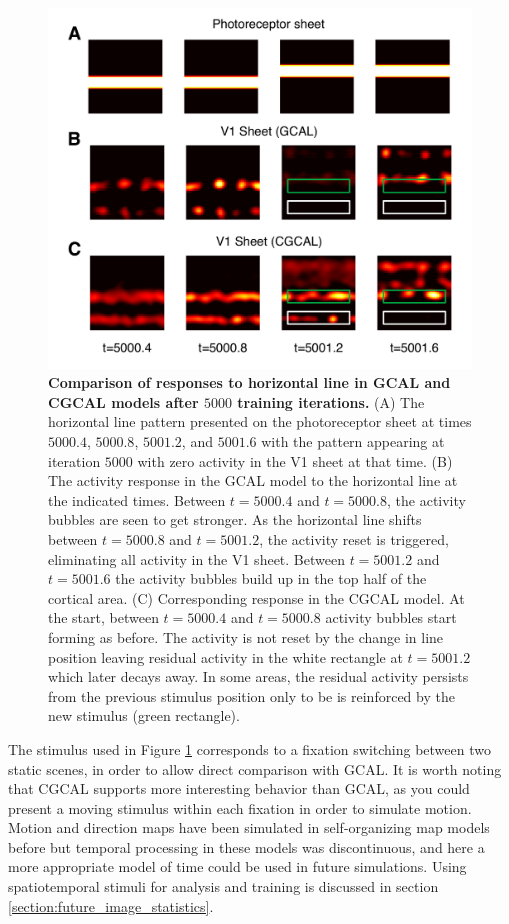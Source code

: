 \documentclass[phd,ianc,twoside]{infthesis}
\begin{document}
\begin{figure}
\centerline{ \includegraphics[scale=0.7]{./figures/V1_activity_CGCAL.pdf} }
\caption[]{{\bf Comparison of responses to horizontal line in GCAL and
    CGCAL models after $5000$ training iterations.} (A) The horizontal
  line pattern presented on the photoreceptor sheet at times $5000.4$,
  $5000.8$, $5001.2$, and $5001.6$ with the pattern appearing at iteration
  $5000$ with zero activity in the V1 sheet at that time. (B) The
  activity response in the GCAL model to the horizontal line at the
  indicated times. Between $t=5000.4$ and $t=5000.8$, the activity
  bubbles are seen to get stronger. As the horizontal line shifts
  between $t=5000.8$ and $t=5001.2$, the activity reset is triggered,
  eliminating all activity in the V1 sheet. Between $t=5001.2$ and
  $t=5001.6$ the activity bubbles build up in the top half of the
  cortical area. (C) Corresponding response in the CGCAL model. At the
  start, between $t=5000.4$ and $t=5000.8$ activity bubbles start
  forming as before. The activity is not reset by the change in line
  position leaving residual activity in the white rectangle at
  $t=5001.2$ which later decays away. In some areas, the residual
  activity persists from the previous stimulus position only to be is
  reinforced by the new stimulus (green rectangle).}
\label{fig:V1_activity_CGCAL}
\end{figure}

The stimulus used in Figure \ref{fig:V1_activity_CGCAL} corresponds to a
fixation switching between two static scenes, in order to allow direct
comparison with GCAL. It is worth noting that CGCAL supports more
interesting behavior than GCAL, as you could present a moving stimulus
within each fixation in order to simulate motion. Motion and direction
maps have been simulated in self-organizing map models before
\citep{bednar_jpp12,miikkulainen_2005} but temporal processing in
these models was discontinuous, and here a more appropriate model of
time could be used in future simulations.  Using
spatiotemporal stimuli for analysis and training is discussed in
section \ref{section:future_image_statistics}.
\end{document}
